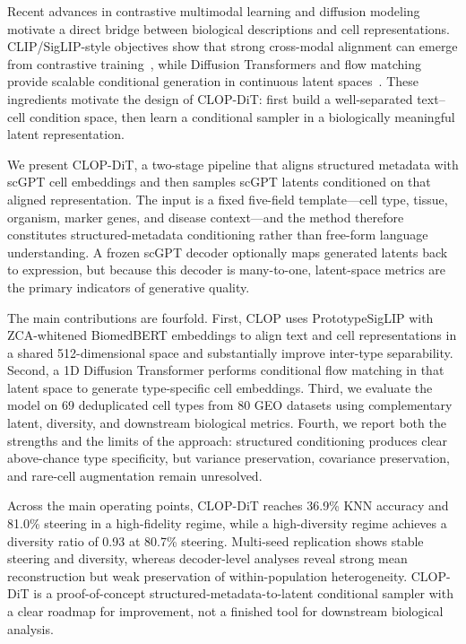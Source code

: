 \documentclass[biology,article,submit,pdftex,moreauthors]{Definitions/mdpi}
\begin{document}
Recent advances in contrastive multimodal learning and diffusion modeling motivate a direct bridge between biological descriptions and cell representations. CLIP/SigLIP-style objectives show that strong cross-modal alignment can emerge from contrastive training~\cite{ref-clip,ref-siglip}, while Diffusion Transformers and flow matching provide scalable conditional generation in continuous latent spaces~\cite{ref-dit,ref-flow-matching,ref-albergo-flow,ref-rectified-flow}. These ingredients motivate the design of CLOP-DiT: first build a well-separated text--cell condition space, then learn a conditional sampler in a biologically meaningful latent representation.

We present CLOP-DiT, a two-stage pipeline that aligns structured metadata with scGPT cell embeddings and then samples scGPT latents conditioned on that aligned representation. The input is a fixed five-field template---cell type, tissue, organism, marker genes, and disease context---and the method therefore constitutes structured-metadata conditioning rather than free-form language understanding. A frozen scGPT decoder optionally maps generated latents back to expression, but because this decoder is many-to-one, latent-space metrics are the primary indicators of generative quality.

The main contributions are fourfold. First, CLOP uses PrototypeSigLIP with ZCA-whitened BiomedBERT embeddings to align text and cell representations in a shared 512-dimensional space and substantially improve inter-type separability. Second, a 1D Diffusion Transformer performs conditional flow matching in that latent space to generate type-specific cell embeddings. Third, we evaluate the model on 69 deduplicated cell types from 80 GEO datasets using complementary latent, diversity, and downstream biological metrics. Fourth, we report both the strengths and the limits of the approach: structured conditioning produces clear above-chance type specificity, but variance preservation, covariance preservation, and rare-cell augmentation remain unresolved.

Across the main operating points, CLOP-DiT reaches 36.9\% KNN accuracy and 81.0\% steering in a high-fidelity regime, while a high-diversity regime achieves a diversity ratio of 0.93 at 80.7\% steering. Multi-seed replication shows stable steering and diversity, whereas decoder-level analyses reveal strong mean reconstruction but weak preservation of within-population heterogeneity. CLOP-DiT is a proof-of-concept structured-metadata-to-latent conditional sampler with a clear roadmap for improvement, not a finished tool for downstream biological analysis.
\end{document}
